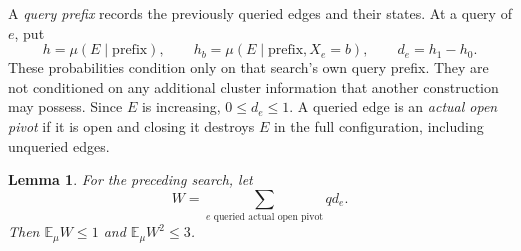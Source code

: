 \documentclass[11pt]{article}
\newtheorem{lemma}[theorem]{Lemma}
\theoremstyle{definition}
\newcommand{\EE}{\mathbb E}
\begin{document}
A \emph{query prefix} records the previously queried edges and their
states. At a query of $e$, put
\[
 h=\mu(E\mid\text{prefix}),\qquad
 h_b=\mu(E\mid\text{prefix},X_e=b),\qquad d_e=h_1-h_0.
\]
These probabilities condition only on that search's own query prefix.
They are not conditioned on any additional cluster information that
another construction may possess. Since $E$ is increasing, $0\le d_e\le1$.
A queried edge is an \emph{actual open pivot} if it is open and closing
it destroys $E$ in the full configuration, including unqueried edges.

\begin{lemma}\label{lem:dfs}
For the preceding search, let
\[
 W=\sum_{e\text{ queried actual open pivot}}q d_e.
\]
Then $\EE_\mu W\le1$ and $\EE_\mu W^2\le3$.
\end{lemma}
\end{document}
